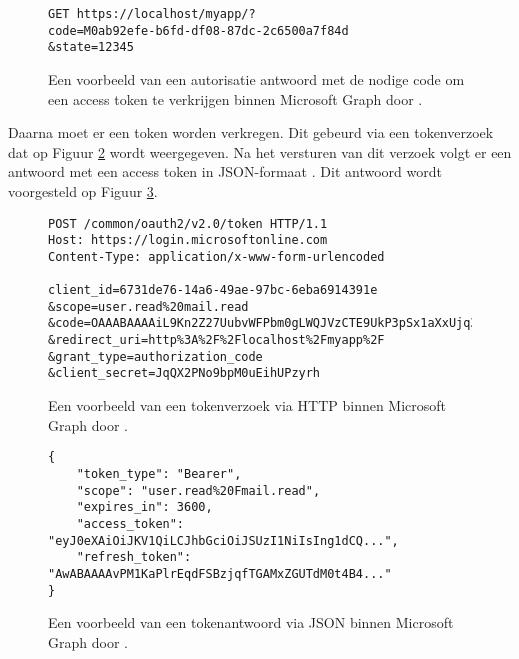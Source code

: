 \begin{figure}[h!]
    \scriptsize
    \begin{verbatim}
GET https://localhost/myapp/?
code=M0ab92efe-b6fd-df08-87dc-2c6500a7f84d
&state=12345
    \end{verbatim}    
    \caption[Voorbeeld Microsoft Graph Authorization response]{Een voorbeeld van een autorisatie antwoord met de nodige code om een access token te verkrijgen binnen Microsoft Graph door \textcite{Microsoft2023r}.}
    \label{MSGAR}
\end{figure}

Daarna moet er een token worden verkregen. Dit gebeurd via een tokenverzoek dat op Figuur \ref{HTR} wordt weergegeven. Na het versturen van dit verzoek volgt er een antwoord met een access token in \ac{JSON}-formaat \autocite{Microsoft2023r}. Dit antwoord wordt voorgesteld op Figuur \ref{HTRES}. \\ 

\begin{figure}[!h]
    \scriptsize
    \begin{verbatim}
POST /common/oauth2/v2.0/token HTTP/1.1
Host: https://login.microsoftonline.com
Content-Type: application/x-www-form-urlencoded
        
client_id=6731de76-14a6-49ae-97bc-6eba6914391e
&scope=user.read%20mail.read
&code=OAAABAAAAiL9Kn2Z27UubvWFPbm0gLWQJVzCTE9UkP3pSx1aXxUjq3n8b2JRLk4OxVXr...
&redirect_uri=http%3A%2F%2Flocalhost%2Fmyapp%2F
&grant_type=authorization_code
&client_secret=JqQX2PNo9bpM0uEihUPzyrh
    \end{verbatim}
    \caption[Voorbeeld User Token Request Microsoft Graph]{Een voorbeeld van een tokenverzoek via \ac{HTTP} binnen Microsoft Graph door \textcite{Microsoft2023r}.}
    \label{HTR}
\end{figure}

\begin{figure}[!h]
    \scriptsize
    \begin{verbatim}
{
    "token_type": "Bearer",
    "scope": "user.read%20Fmail.read",
    "expires_in": 3600,
    "access_token": "eyJ0eXAiOiJKV1QiLCJhbGciOiJSUzI1NiIsIng1dCQ...",
    "refresh_token": "AwABAAAAvPM1KaPlrEqdFSBzjqfTGAMxZGUTdM0t4B4..."
}        
    \end{verbatim}    
    \caption[Voorbeeld User Token Response Microsoft Graph]{Een voorbeeld van een tokenantwoord via \ac{JSON} binnen Microsoft Graph door \textcite{Microsoft2023r}.}
    \label{HTRES}
\end{figure}

